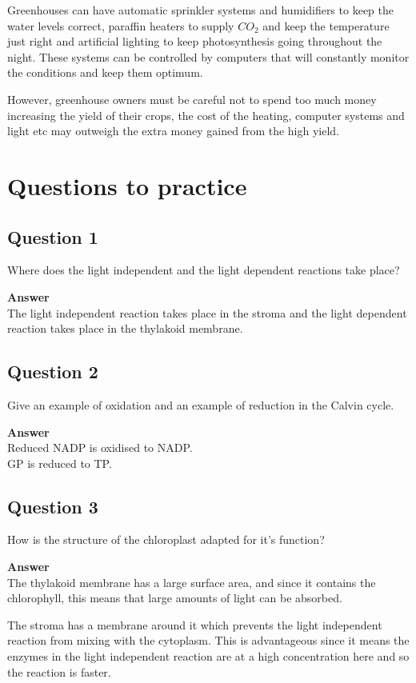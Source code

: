 \documentclass{article}
\begin{document}
Greenhouses can have automatic sprinkler systems and humidifiers to keep the water levels correct, paraffin heaters to supply $CO_2$ and keep the temperature just right and artificial lighting to keep photosynthesis going throughout the night. These systems can be controlled by computers that will constantly monitor the conditions and keep them optimum.

However, greenhouse owners must be careful not to spend too much money increasing the yield of their crops, the cost of the heating, computer systems and light etc may outweigh the extra money gained from the high yield.


\section*{Questions to practice}
\subsection*{Question 1}
Where does the light independent and the light dependent reactions take place?

\textbf{Answer}\\
The light independent reaction takes place in the stroma and the light dependent reaction takes place in the thylakoid membrane.

\subsection*{Question 2}
Give an example of oxidation and an example of reduction in the Calvin cycle.

\textbf{Answer}\\
Reduced NADP is oxidised to NADP.\\
GP is reduced to TP.

\subsection*{Question 3}
How is the structure of the chloroplast adapted for it's function?

\textbf{Answer}\\
The thylakoid membrane has a large surface area, and since it contains the chlorophyll, this means that large amounts of light can be absorbed.

The stroma has a membrane around it which prevents the light independent reaction from mixing with the cytoplasm. This is advantageous since it means the enzymes in the light independent reaction are at a high concentration here and so the reaction is faster.
\end{document}
